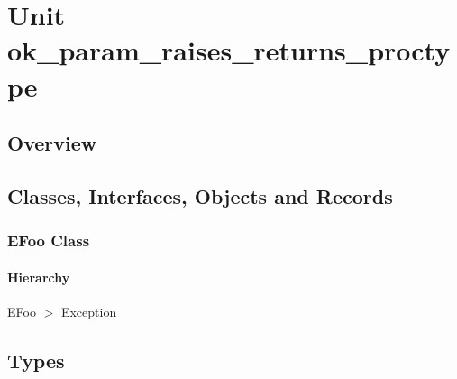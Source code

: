 \documentclass{report}
\begin{document}
\newlength{\tmplength}
\chapter{Unit ok{\_}param{\_}raises{\_}returns{\_}proctype}
\section{Overview}
\begin{description}
\item[\texttt{\begin{ttfamily}EFoo\end{ttfamily} Class}]
\end{description}
\section{Classes, Interfaces, Objects and Records}
\subsection*{EFoo Class}
\subsubsection*{\large{\textbf{Hierarchy}}\normalsize\hspace{1ex}\hfill}
EFoo {$>$} Exception
\section{Types}
\end{document}
